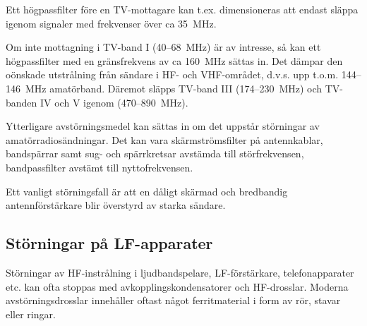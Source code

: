Ett högpassfilter före en TV-mottagare kan t.ex. dimensioneras att endast släppa
igenom signaler med frekvenser över ca 35~MHz.

Om inte mottagning i TV-band I (40--68~MHz) är av intresse, så kan ett
högpassfilter med en gränsfrekvens av ca 160~MHz sättas in.
Det dämpar den oönskade utstrålning från sändare i HF- och VHF-området,
d.v.s. upp t.o.m. 144--146~MHz amatörband.
Däremot släpps TV-band III (174--230~MHz) och TV-banden IV och V igenom
(470--890~MHz).

Ytterligare avstörningsmedel kan sättas in om det uppstår störningar av
amatörradiosändningar.
Det kan vara skärmströmsfilter på antennkablar, bandspärrar samt sug- och
spärrkretsar avstämda till störfrekvensen, bandpassfilter avstämt till
nyttofrekvensen.

Ett vanligt störningsfall är att en dåligt skärmad och bredbandig
antennförstärkare blir överstyrd av starka sändare.

\subsection{Störningar på LF-apparater}

Störningar av HF-instrålning i ljudbandspelare, LF-förstärkare, telefonapparater
etc. kan ofta stoppas med avkopplingskondensatorer och HF-drosslar.
Moderna avstörningsdrosslar innehåller oftast något ferritmaterial i form av
rör, stavar eller ringar.
